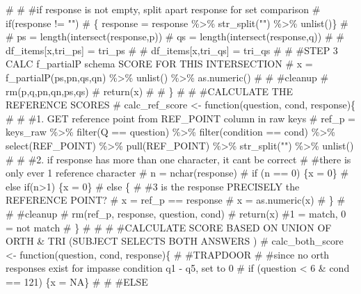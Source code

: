 \documentclass[
  letterpaper,
  DIV=11,
  numbers=noendperiod]{scrreprt}
\newenvironment{Shaded}{\begin{snugshade}}{\end{snugshade}}
\newcommand{\CommentTok}[1]{\textcolor[rgb]{0.37,0.37,0.37}{#1}}
\begin{document}
\begin{Shaded}
\begin{Highlighting}[]
\CommentTok{\#   }
\CommentTok{\#   \#if response is not empty, split apart response for set comparison}
\CommentTok{\#     if(response != "")}
\CommentTok{\#     \{ response = response \%\textgreater{}\% str\_split("") \%\textgreater{}\% unlist()\}}
\CommentTok{\#     }
\CommentTok{\#   ps = length(intersect(response,p))}
\CommentTok{\#   qs = length(intersect(response,q))}
\CommentTok{\#   \# df\_items[x,\textquotesingle{}tri\_ps\textquotesingle{}] = tri\_ps}
\CommentTok{\#   \# df\_items[x,\textquotesingle{}tri\_qs\textquotesingle{}] = tri\_qs}
\CommentTok{\# }
\CommentTok{\#   \#STEP 3 CALC f\_partialP schema SCORE FOR THIS INTERSECTION}
\CommentTok{\#   x = f\_partialP(ps,pn,qs,qn) \%\textgreater{}\% unlist() \%\textgreater{}\% as.numeric()}
\CommentTok{\#   }
\CommentTok{\#   \#cleanup}
\CommentTok{\#   rm(p,q,pn,qn,ps,qs)}
\CommentTok{\#   return(x)}
\CommentTok{\# }
\CommentTok{\# \}}
\CommentTok{\# }
\CommentTok{\# \#CALCULATE THE REFERENCE SCORES}
\CommentTok{\# calc\_ref\_score \textless{}{-} function(question, cond, response)\{}
\CommentTok{\#   }
\CommentTok{\#     \#1. GET reference point from REF\_POINT column in raw keys}
\CommentTok{\#     ref\_p = keys\_raw \%\textgreater{}\% filter(Q == question) \%\textgreater{}\% filter(condition == cond) \%\textgreater{}\% select(REF\_POINT) \%\textgreater{}\% pull(REF\_POINT) \%\textgreater{}\% str\_split("") \%\textgreater{}\% unlist()}
\CommentTok{\#      }
\CommentTok{\#     \#2. if response has more than one character, it can\textquotesingle{}t be correct}
\CommentTok{\#     \#there is only ever 1 reference character}
\CommentTok{\#     n = nchar(response)}
\CommentTok{\#     if (n == 0) \{x = 0\}}
\CommentTok{\#     else if(n\textgreater{}1) \{x = 0\}}
\CommentTok{\#     else \{}
\CommentTok{\#       \#3 is the response PRECISELY the REFERENCE POINT?}
\CommentTok{\#       x = ref\_p == response}
\CommentTok{\#       x = as.numeric(x)  }
\CommentTok{\#     \}}
\CommentTok{\#     }
\CommentTok{\#     \#cleanup}
\CommentTok{\#     rm(ref\_p, response, question, cond)   }
\CommentTok{\#     return(x) \#1 = match, 0 = not match}
\CommentTok{\# \}}
\CommentTok{\# }
\CommentTok{\# }
\CommentTok{\# \#CALCULATE SCORE BASED ON UNION OF ORTH \& TRI (SUBJECT SELECTS BOTH ANSWERS )}
\CommentTok{\# calc\_both\_score \textless{}{-} function(question, cond, response)\{}
\CommentTok{\#   }
\CommentTok{\#TRAPDOOR }
\CommentTok{\#   \#since no orth responses exist for impasse condition q1 {-} q5, set to 0}
\CommentTok{\#   if (question \textless{} 6 \& cond == 121) \{x = NA\}}
\CommentTok{\#   }
\CommentTok{\#   \#ELSE }

\end{Highlighting}
\end{Shaded}
\end{document}
